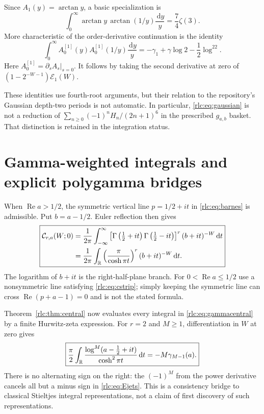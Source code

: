 \documentclass[11pt,a4paper]{article}
\numberwithin{equation}{section}
\theoremstyle{definition}\newtheorem{definition}[theorem]{Definition}
\theoremstyle{remark}\newtheorem{remark}[theorem]{Remark}
\DeclareMathOperator{\Rea}{Re}
\newcommand{\dd}{\,\mathrm d}
\newcommand{\E}{\mathcal E}
\newcommand{\CC}{\mathcal C}
\begin{document}
Since $A_1(y)=\arctan y$, a basic specialization is
\begin{equation}\label{rlc:eq:arctan}
 \int_0^\infty\arctan y\,\arctan(1/y)\frac{\dd y}{y}
     =\frac74\zeta(3).
\end{equation}
More characteristic of the order-derivative continuation is the identity
\begin{equation}\label{rlc:eq:gaussianjets}
 \int_0^\infty A_0^{[1]}(y)A_0^{[1]}(1/y)\frac{\dd y}{y}
 =-\gamma_1+\gamma\log2-\frac12\log^22.
\end{equation}
Here $A_0^{[1]}=\left.\partial_sA_s\right|_{s=0}$.
It follows by taking the second derivative at zero of
$(1-2^{-W-1})\E_1(W)$.

These identities use fourth-root arguments, but their relation to the
repository's Gaussian depth-two periods is not automatic. In particular,
\eqref{rlc:eq:gaussian} is not a reduction of
$\sum_{n\ge0}(-1)^nH_n/(2n+1)^6$ in the prescribed $g_{a,b}$ basket.
That distinction is retained in the integration status.



\section{Gamma-weighted integrals and explicit polygamma bridges}
\label{rlc:sec:gamma}

When $\Rea a>1/2$, the symmetric vertical line $p=1/2+it$ in
\eqref{rlc:eq:barnes} is admissible. Put $b=a-1/2$. Euler reflection
then gives
\begin{equation}\label{rlc:eq:gammacentral}
 \boxed{\displaystyle
 \begin{aligned}
 \CC_{r,a}(W;0)&=\frac1{2\pi}\int_{-\infty}^{\infty}
 \left[\Gamma\left(\tfrac12+it\right)
       \Gamma\left(\tfrac12-it\right)\right]^r
 (b+it)^{-W}\dd t\\
 &=\frac1{2\pi}\int_\R
      \left(\frac\pi{\cosh\pi t}\right)^r(b+it)^{-W}\dd t.
 \end{aligned}}
\end{equation}
The logarithm of $b+it$ is the right-half-plane branch. For
$0<\Rea a\le1/2$ use a nonsymmetric line satisfying
\eqref{rlc:eq:cstrip}; simply keeping the symmetric line can cross
$\Rea(p+a-1)=0$ and is not the stated formula.

Theorem~\ref{rlc:thm:central} now evaluates every integral in
\eqref{rlc:eq:gammacentral} by a finite Hurwitz-zeta expression.
For $r=2$ and $M\ge1$, differentiation in $W$ at zero gives
\begin{equation}\label{rlc:eq:gammastieltjes}
 \boxed{\displaystyle
 \frac\pi2\int_\R
     \frac{\log^M(a-\tfrac12+it)}{\cosh^2\pi t}\dd t
       =-M\gamma_{M-1}(a).}
\end{equation}
There is no alternating sign on the right: the $(-1)^M$ from the
power derivative cancels all but a minus sign in
\eqref{rlc:eq:Ejets}. This is a consistency bridge to classical
Stieltjes integral representations, not a claim of first discovery
of such representations.
\end{document}
